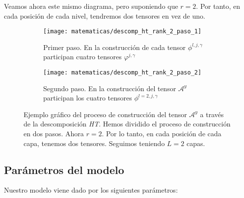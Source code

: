 Veamos ahora este mismo diagrama, pero suponiendo que $r = 2$. Por tanto, en cada posición de cada nivel, tendremos dos tensores en vez de uno.

\begin{figure}[H]
\centering
    \ajustarsubcaptions
    \begin{subfigure}{.5\textwidth}
        \centering
        \texttt{[image: matematicas/descomp\_ht\_rank\_2\_paso\_1]}
        \caption{Primer paso. En la construcción de cada tensor $\phi^{l, j, \gamma}$ participan cuatro tensores $\varphi^{j, \gamma}$}
    \end{subfigure}%
    \begin{subfigure}{.5\textwidth}
        \centering
        \texttt{[image: matematicas/descomp\_ht\_rank\_2\_paso\_2]}
        \caption{Segundo paso. En la construcción del tensor $\mathcal{A}^y$ participan los cuatro tensores $\phi^{l=2, j, \gamma}$}
    \end{subfigure}
    \caption{Ejemplo gráfico del proceso de construcción del tensor $\mathcal{A}^y$ a través de la descomposición \textit{HT}. Hemos dividido el proceso de construcción en dos pasos. Ahora $r = 2$. Por lo tanto, en cada posición de cada capa, tenemos dos tensores. Seguimos teniendo $L = 2$ capas. }
    \label{img:diagrama_ht_complejo}
\end{figure}


\subsection{Parámetros del modelo} \label{msubs:parametros_modelo_ht}

Nuestro modelo viene dado por los siguientes parámetros:

